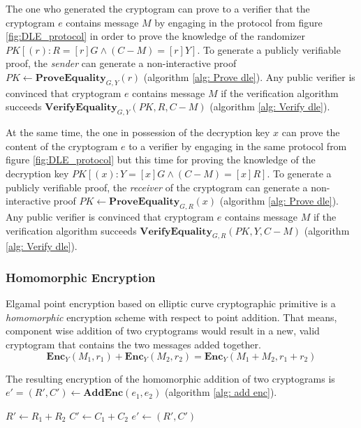The one who generated the cryptogram can prove to a verifier that the cryptogram $e$ contains message $M$ by engaging in the protocol from figure \ref{fig:DLE_protocol} in order to prove the knowledge of the randomizer \( PK[(r): R = [r]G \wedge (C - M) = [r]Y] \). To generate a publicly verifiable proof, the \textit{sender} can generate a non-interactive proof \( PK \leftarrow \mathbf{ProveEquality}_{G, Y} (r) \) (algorithm \ref{alg: Prove dle}). Any public verifier is convinced that cryptogram $e$ contains message $M$ if the verification algorithm succeeds \( \mathbf{VerifyEquality}_{G, Y} (PK, R, C - M) \) (algorithm \ref{alg: Verify dle}).

At the same time, the one in possession of the decryption key $x$ can prove the content of the cryptogram $e$ to a verifier by engaging in the same protocol from figure \ref{fig:DLE_protocol} but this time for proving the knowledge of the decryption key \( PK[(x): Y = [x]G \wedge (C - M) = [x]R] \). To generate a publicly verifiable proof, the \textit{receiver} of the cryptogram can generate a non-interactive proof \( PK \leftarrow \mathbf{ProveEquality}_{G, R} (x) \) (algorithm \ref{alg: Prove dle}). Any public verifier is convinced that cryptogram $e$ contains message $M$ if the verification algorithm succeeds \( \mathbf{VerifyEquality}_{G, R} (PK, Y, C - M) \) (algorithm \ref{alg: Verify dle}).

\subsubsection{Homomorphic Encryption}
Elgamal point encryption based on elliptic curve cryptographic primitive is a \textit{homomorphic} encryption scheme with respect to point addition. That means, component wise addition of two cryptograms would result in a new, valid cryptogram that contains the two messages added together.
\[
\mathbf{Enc}_Y(M_1, r_1) + \mathbf{Enc}_Y(M_2, r_2) = \mathbf{Enc}_Y(M_1 + M_2, r_1 + r_2)
\]

The resulting encryption of the homomorphic addition of two cryptograms is \( e' = (R', C') \leftarrow \mathbf{AddEnc} (e_1, e_2) \) (algorithm \ref{alg: add enc}).

\begin{algorithm}[H]
\DontPrintSemicolon
    \caption{\( \mathbf{AddEnc} (e_1, e_2) \)}
    \( R' \gets R_1 + R_2 \)\;
    \( C' \gets C_1 + C_2 \)\;
    \( e' \gets (R', C') \)\;
     
\end{algorithm}

